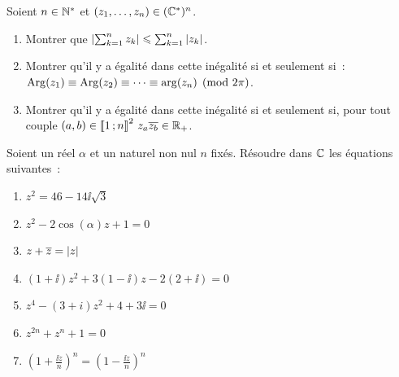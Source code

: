                                 \begin{exercice}
                                  Soient \(n \in \mathbb{N}^{*}\) et \((z_1, \ldots, z_n) \in (\mathbb{C}^{*})^n\).
                                  \begin{enumerate}
                                    \item Montrer que \( \left\lvert\sum_{k = 1}^n z_k\right\rvert \leqslant \sum_{k = 1}^n 
                                      \left\lvert z_k\right\rvert\).
                                    \item Montrer qu'il y a égalité dans cette inégalité si et seulement 
                                      si~: \(\operatorname{Arg}(z_1) \equiv \operatorname{Arg}(z_2) \equiv \cdots \equiv \arg(z_n) 
                                      \pmod{2\pi}\).
                                    \item Montrer qu'il y a égalité dans cette inégalité si et seulement si, 
                                      pour tout couple \((a,b) \in \mathopen{\llbracket}1\mathclose{}\mathpunct{};n\mathclose{\rrbracket}^2 \ z_a 
                                      \overline{z_b} \in \mathbb{R}_{+}\).
                                  \end{enumerate}
                                \end{exercice}

                                \begin{exercice}
                                  Soient un réel \(\alpha\) et un naturel non nul \(n\) fixés. Résoudre dans 
                                  \(\mathbb{C}\) les équations suivantes~:
                                  \begin{multicols}{2}
                                    \begin{enumerate}
                                      \item \(z^2 = 46-14\ii\sqrt{3}\)
                                      \item \(z^2-2\cos(\alpha)z + 1 = 0\)
                                      \item \(z + \overline{z} = \left\lvert z\right\rvert\)
                                      \item \((1 + \ii)z^2 + 3(1-\ii)z-2(2 + \ii) = 0\)
                                      \item \(z^4-(3 + i)z^2 + 4 + 3\ii = 0\)
                                      \item \(z^{2n} + z^n + 1 = 0\)
                                      \item \(\left( 1 + \frac{\ii z}{n} \right)^n = \left( 1-\frac{\ii 
                                        z}{n} \right)^n\)
                                    \end{enumerate}
                                  \end{multicols}
                                \end{exercice}

